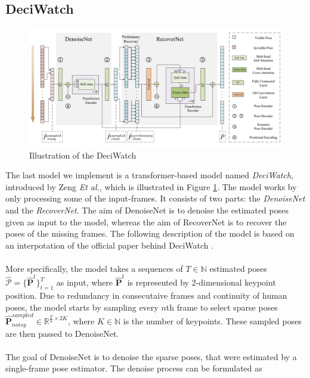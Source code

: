 \documentclass[./main.tex]{subfiles}
\begin{document}
\subsection{DeciWatch}
\begin{figure}[htbp]
    \centering
    \includegraphics[width=\textwidth]{./entities/deciwatch.PNG}
    \caption{Illustration of the DeciWatch \cite{https://doi.org/10.48550/arxiv.2203.08713}}
    \label{fig:deciwatch}
\end{figure}
\noindent The last model we implement is a transformer-based model named \textit{DeciWatch}, introduced by Zeng \textit{Et al.}, which is illustrated in Figure \ref{fig:deciwatch}. The model works by only processing some of the input-frames. It consists of two parts: the \textit{DenoiseNet} and the \textit{RecoverNet}. The aim of DenoiseNet is to denoise the estimated poses given as input to the model, whereas the aim of RecoverNet is to recover the poses of the missing frames. The following description of the model is based on an interpotation of the official paper behind DeciWatch \cite{https://doi.org/10.48550/arxiv.2203.08713}.
\\
\\
More specifically, the model takes a sequences of $T \in \mathbb{N}$ estimated poses $\hat{\mathcal{P}} = \{\hat{\bm{P}}^t\}_{t = 1} ^T$ as input, where $\hat{\bm{P}}^t$ is represented by 2-dimensional keypoint position. Due to redundancy in consecutaive frames and continuity of human poses, the model starts by sampling every $n$th frame to select sparse poses $\hat{\bm{P}}^{sampled} _{noisy} \in \mathbb{R}^{\frac{T}{n} \times 2K}$, where $K \in \mathbb{N}$ is the number of keypoints. These sampled poses are then passed to DenoiseNet.
\\
\\
The goal of DenoiseNet is to denoise the sparse poses, that were estimated by a single-frame pose estimator. The denoise process can be formulated as
\end{document}
